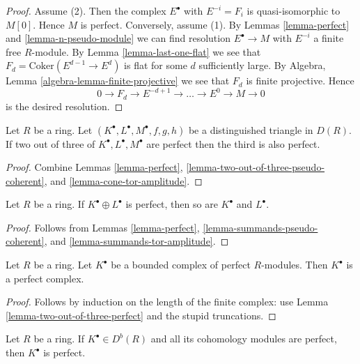 \begin{proof}
Assume (2). Then the complex $E^\bullet$ with $E^{-i} = F_i$
is quasi-isomorphic to $M[0]$. Hence $M$ is perfect.
Conversely, assume (1). By
Lemmas \ref{lemma-perfect} and \ref{lemma-n-pseudo-module}
we can find resolution $E^\bullet \to M$ with $E^{-i}$ a finite free
$R$-module. By
Lemma \ref{lemma-last-one-flat}
we see that $F_d = \text{Coker}(E^{d - 1} \to E^d)$ is flat for
some $d$ sufficiently large. By
Algebra, Lemma \ref{algebra-lemma-finite-projective}
we see that $F_d$ is finite projective.
Hence
$$
0 \to F_d \to E^{-d+1} \to \ldots \to E^0 \to M \to 0
$$
is the desired resolution.
\end{proof}

\begin{lemma}
\label{lemma-two-out-of-three-perfect}
Let $R$ be a ring. Let $(K^\bullet, L^\bullet, M^\bullet, f, g, h)$
be a distinguished triangle in $D(R)$. If two out of three of
$K^\bullet, L^\bullet, M^\bullet$ are
perfect then the third is also perfect.
\end{lemma}

\begin{proof}
Combine
Lemmas \ref{lemma-perfect}, \ref{lemma-two-out-of-three-pseudo-coherent}, and
\ref{lemma-cone-tor-amplitude}.
\end{proof}

\begin{lemma}
\label{lemma-summands-perfect}
Let $R$ be a ring. If $K^\bullet \oplus L^\bullet$ is perfect, then
so are $K^\bullet$ and $L^\bullet$.
\end{lemma}

\begin{proof}
Follows from
Lemmas \ref{lemma-perfect}, \ref{lemma-summands-pseudo-coherent}, and
\ref{lemma-summands-tor-amplitude}.
\end{proof}

\begin{lemma}
\label{lemma-complex-perfect-modules}
Let $R$ be a ring. Let $K^\bullet$ be a bounded complex of perfect
$R$-modules. Then $K^\bullet$ is a perfect complex.
\end{lemma}

\begin{proof}
Follows by induction on the length of the finite complex: use
Lemma \ref{lemma-two-out-of-three-perfect}
and the stupid truncations.
\end{proof}

\begin{lemma}
\label{lemma-cohomology-perfect}
Let $R$ be a ring. If $K^\bullet \in D^b(R)$ and all its cohomology
modules are perfect, then $K^\bullet$ is perfect.
\end{lemma}

